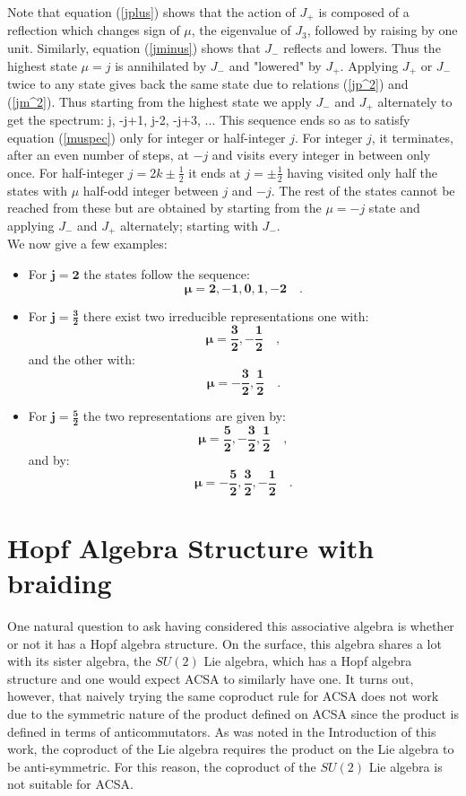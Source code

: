 Note that equation (\ref{jplus}) shows that the action of $J_+$ is
composed of a reflection which changes sign of $\mu$, the
eigenvalue of $J_3$, followed by raising by one unit. Similarly,
equation (\ref{jminus}) shows that $J_-$ reflects and lowers. Thus
the highest state $\mu = j$ is annihilated by $J_-$ and "lowered"
by $J_+$. Applying $J_+$ or $J_-$ twice to any state gives back
the same state due to relations (\ref{jp^2}) and (\ref{jm^2}).
Thus starting from the highest state we apply $J_-$ and $J_+$
alternately to get the spectrum: \beq j, -j+1, j-2, -j+3, ... \eeq
This sequence ends so as to satisfy equation (\ref{muspec}) only
for integer or half-integer $j$. For integer $j$, it terminates,
after an even number of steps, at $-j$ and visits every integer in
between only once. For half-integer $j=2k\pm\frac{1}{2}$ it ends
at $j=\pm\frac{1}{2}$ having visited only half the states with
$\mu$ half-odd integer between $j$ and $-j$. The rest of the
states cannot be reached from these but are obtained by starting
from the $\mu= -j$ state and applying $J_-$ and $J_+$ alternately;
starting with $J_-$.
\\
We now give a few examples:
\begin{itemize}
  \item
For $\mathbf{j=2}$ the states follow the sequence:
\[
\mathbf{\mu = 2, -1, 0, 1, -2}\quad.
\]
  \item
For $\mathbf{j=\frac{3}{2}}$ there exist two irreducible
representations one with:
\[
\mathbf{\mu = \frac{3}{2}, -\frac{1}{2}}\quad,
\] and the other with:
\[
\mathbf{\mu = -\frac{3}{2}, \frac{1}{2}}\quad.
\]

  \item
For $\mathbf{j=\frac{5}{2}}$ the two representations are given by:
\[
\mathbf{\mu = \frac{5}{2}, -\frac{3}{2}, \frac{1}{2}}\quad,
\] and by:
\[
\mathbf{\mu = -\frac{5}{2}, \frac{3}{2}, -\frac{1}{2}}\quad.
\]

\end{itemize}

\section{Hopf Algebra Structure with braiding}

One natural question to ask having considered this associative algebra is whether or not it has a Hopf algebra structure. On the surface, this algebra shares a lot with its sister algebra, the $SU(2)$ Lie algebra, which has a Hopf algebra structure and one would expect ACSA to similarly have one. It turns out, however, that naively trying the same coproduct rule for ACSA does not work due to the symmetric nature of the product defined on ACSA since the product is defined in terms of anticommutators. As was noted in the Introduction of this work, the coproduct of the Lie algebra requires the product on the Lie algebra to be anti-symmetric. For this reason, the coproduct of the $SU(2)$ Lie algebra is not suitable for ACSA.


